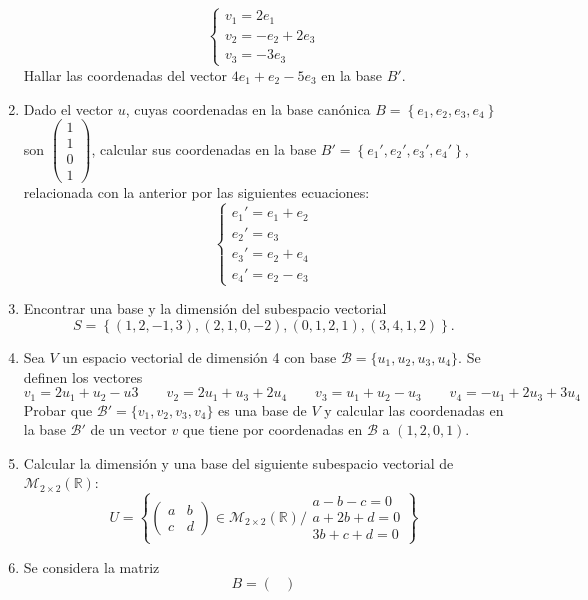 \documentclass[12pt]{article}
\begin{document}
\begin{enumerate}
  $$
  \begin{cases}
    v_1 = 2e_1\\
    v_2 = -e_2+2e_3\\
    v_3 = -3e_3
  \end{cases}
  $$
  Hallar las coordenadas del vector $4e_1+e_2-5e_3$ en la base $B'$.
  \item Dado el vector $u$, cuyas coordenadas en la base canónica $B=\left\{e_1,e_2,e_3,e_4\right\}$ son $\begin{pmatrix}
    1\\1\\0\\1
  \end{pmatrix}$, calcular sus coordenadas en la base $B'=\left\{e_1',e_2',e_3',e_4'\right\}$, relacionada con la anterior por las siguientes ecuaciones:
  $$
  \begin{cases}
    e_1'=e_1+e_2\\
    e_2'=e_3\\
    e_3'=e_2+e_4\\
    e_4'=e_2-e_3
  \end{cases}
  $$
  \item Encontrar una base y la dimensión del subespacio vectorial
  $$
  S =\left\{(1, 2, -1, 3), (2, 1, 0, -2), (0, 1, 2, 1), (3, 4, 1, 2)\right\}.
  $$
  \item Sea $V$ un espacio vectorial de dimensión 4 con base $\mathcal{B} = \{u_1 , u_2 , u_3 , u_4 \}$. Se definen los vectores
  $$
  v_1 = 2u_1 + u_2 - u3 \qquad
  v_2 = 2u_1 + u_3 + 2u_4 \qquad
  v_3 = u_1 + u_2 - u_3 \qquad
  v_4 = -u_1 + 2u_3 + 3u_4
  $$
  Probar que $\mathcal{B'} = \{v_1 , v_2 , v_3 , v_4 \}$ es una base de $V$ y calcular las coordenadas en la base $\mathcal{B'}$ de un vector  $v$ que tiene por coordenadas en $\mathcal{B}$ a $(1, 2, 0, 1)$.
  \item Calcular la dimensión y una base del siguiente subespacio vectorial de $\mathcal{M}_{2\times2}(\mathbb{R})$:
  $$
  U=\left\{\begin{pmatrix}
  a & b\\
  c & d
  \end{pmatrix} \in \mathcal{M}_{2\times2}(\mathbb{R}) / \begin{array}{l}
    a - b - c = 0\\
    a + 2b + d = 0\\
    3b + c + d = 0
  \end{array} \right\}
  $$
  \item Se considera la matriz
  $$
  B=\begin{pmatrix}

\end{pmatrix}$$
\end{enumerate}
\end{document}
